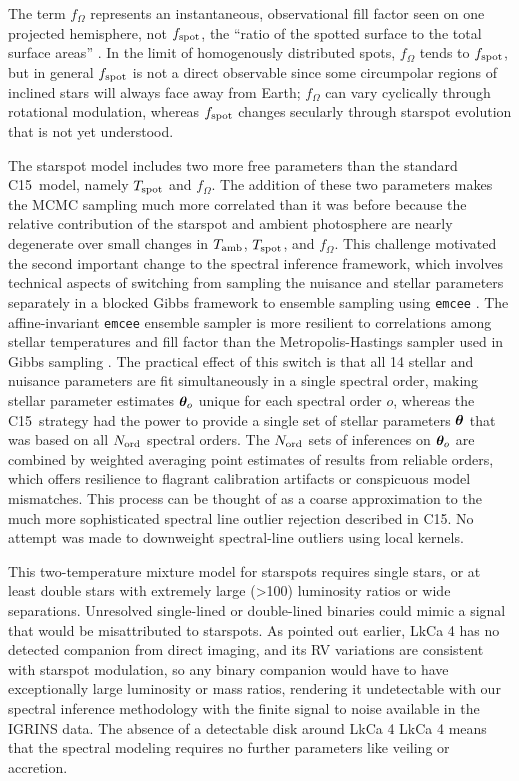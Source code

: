 \documentclass[twocolumn]{emulateapj}%
\newcommand{\iancze}{{\sc C15}}
\begin{document}
The term $f_{\Omega}$ represents an instantaneous, observational fill factor seen on one projected hemisphere, not $f_{\rm spot}$, the ``ratio of the spotted surface to the total surface areas'' \citep{somers15}.  In the limit of homogenously distributed spots, $f_{\Omega}$ tends to $f_{\rm spot}$, but in general $f_{\rm spot}$ is not a direct observable since some circumpolar regions of inclined stars will always face away from Earth; $f_{\Omega}$ can vary cyclically through rotational modulation, whereas $f_{\rm spot}$ changes secularly through starspot evolution that is not yet understood.

The starspot model includes two more free parameters than the standard \iancze\ model, namely $T_\textrm{spot}$ and $f_{\Omega}$.  The addition of these two parameters makes the MCMC sampling much more correlated than it was before because the relative contribution of the starspot and ambient photosphere are nearly degenerate over small changes in $T_\textrm{amb}$, $T_\textrm{spot}$, and $f_{\Omega}$.  This challenge motivated the second important change to the spectral inference framework, which involves technical aspects of switching from sampling the nuisance and stellar parameters separately in a blocked Gibbs framework to ensemble sampling using \texttt{emcee} \citep{foreman13}.  The affine-invariant \texttt{emcee} ensemble sampler is more resilient to correlations among stellar temperatures and fill factor than the Metropolis-Hastings sampler used in Gibbs sampling \citep{}.  The practical effect of this switch is that all 14 stellar and nuisance parameters are fit simultaneously in a single spectral order, making stellar parameter estimates ${\bm \theta}_{o}$ unique for each spectral order $o$, whereas the \iancze\ strategy had the power to provide a single set of stellar parameters ${\bm \theta}$ that was based on all $N_{\rm ord}$ spectral orders.  The $N_{\rm ord}$ sets of inferences on ${\bm \theta}_{o}$ are combined by weighted averaging point estimates of results from reliable orders, which offers resilience to flagrant calibration artifacts or conspicuous model mismatches.  This process can be thought of as a coarse approximation to the much more sophisticated spectral line outlier rejection described in \iancze.  No attempt was made to downweight spectral-line outliers using local kernels.

This two-temperature mixture model for starspots requires single stars, or at least double stars with extremely large (>100) luminosity ratios or wide separations.  Unresolved single-lined or double-lined binaries could mimic a signal that would be misattributed to starspots.  As pointed out earlier, LkCa 4 has no detected companion from direct imaging, and its RV variations are consistent with starspot modulation, so any binary companion would have to have exceptionally large luminosity or mass ratios, rendering it undetectable with our spectral inference methodology with the finite signal to noise available in the IGRINS data.  The absence of a detectable disk around LkCa 4
LkCa 4 means that the spectral modeling requires no further parameters like veiling or accretion.
\end{document}
